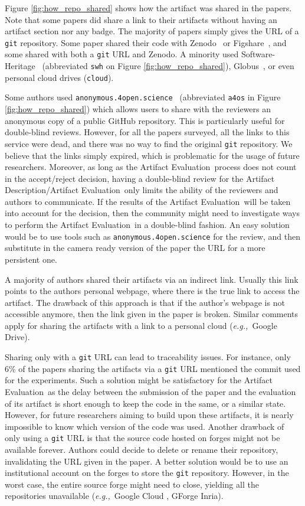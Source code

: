 \documentclass[sigconf,natbib=false]{acmart}
\newcommand{\eg}{\emph{e.g.,}}
\newcommand{\ad}{Artifact Description}
\newcommand{\aeval}{Artifact Evaluation}
\newcommand{\adae}{\ad/\aeval}
\begin{document}
Figure \ref{fig:how_repo_shared} shows how the artifact was shared in the papers.
Note that some papers did share a link to their artifacts without having an artifact section nor any badge.
The majority of papers simply gives the URL of a \texttt{git} repository.
Some paper shared their code with Zenodo\ \cite{zenodo} or Figshare\ \cite{figshare}, and some shared with both a \texttt{git} URL and Zenodo.
A minority used Software-Heritage\ \cite{swheritage} (abbreviated \texttt{swh} on Figure \ref{fig:how_repo_shared}), Globus\ \cite{globus}, or even personal cloud drives (\texttt{cloud}).

Some authors used \texttt{anonymous.4open.science}\ \cite{anonymous_github} (abbreviated \texttt{a4os} in Figure \ref{fig:how_repo_shared}) which allows users to share with the reviewers an anonymous copy of a public GitHub repository.
This is particularly useful for double-blind reviews.
However, for all the papers surveyed, all the links to this service were dead, and there was no way to find the original \texttt{git} repository.
We believe that the links simply expired, which is problematic for the usage of future researchers.
Moreover, as long as the \aeval\ process does not count in the accept/reject decision, having a double-blind review for the \adae\ only limits the ability of the reviewers and authors to communicate.
If the results of the \aeval\ will be taken into account for the decision, then the community might need to investigate ways to perform the \aeval\ in a double-blind fashion.
An easy solution would be to use tools such as \texttt{anonymous.4open.science} \cite{anonymous_github} for the review, and then substitute in the camera ready version of the paper the URL for a more persistent one.

A majority of authors shared their artifacts via an indirect link.
Usually this link points to the authors personal webpage, where there is the true link to access the artifact.
The drawback of this approach is that if the author's webpage is not accessible anymore, then the link given in the paper is broken.
Similar comments apply for sharing the artifacts with a link to a personal cloud (\eg\ Google Drive).

Sharing only with a \texttt{git} URL can lead to traceability issues.
For instance, only 6\% of the papers sharing the artifacts via a \texttt{git} URL mentioned the commit used for the experiments.
Such a solution might be satisfactory for the \aeval\ as the delay between the submission of the paper and the evaluation of its artifact is short enough to keep the code in the same, or a similar state.
However, for future researchers aiming to build upon these artifacts, it is nearly impossible to know which version of the code was used.
Another drawback of only using a \texttt{git} URL is that the source code hosted on forges might not be available forever.
Authors could decide to delete or rename their repository, invalidating the URL given in the paper.
A better solution would be to use an institutional account on the forges to store the \texttt{git} repository.
However, in the worst case, the entire source forge might need to close, yielding all the repositories unavailable (\eg\ Google Cloud \cite{google_code}, GForge Inria).
\end{document}
